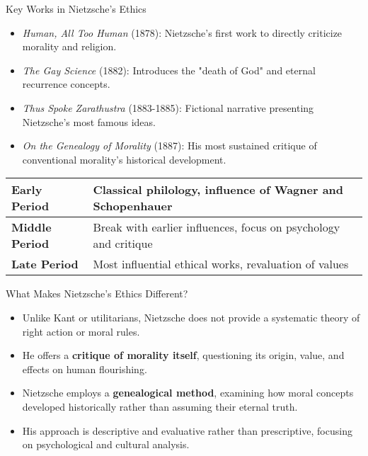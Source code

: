 \documentclass{beamer}
\begin{document}
    \begin{frame}{Key Works in Nietzsche's Ethics}
    \begin{itemize}
    \item \textit{Human, All Too Human} (1878): Nietzsche's first work to directly criticize morality and religion.
    \item \textit{The Gay Science} (1882): Introduces the "death of God" and eternal recurrence concepts.
    \item \textit{Thus Spoke Zarathustra} (1883-1885): Fictional narrative presenting Nietzsche's most famous ideas.
    \item \textit{On the Genealogy of Morality} (1887): His most sustained critique of conventional morality's historical development.
    \end{itemize}
    
    \begin{table}
        \scriptsize
    \begin{tabular}{ll}
    \toprule
    \textbf{Early Period} & Classical philology, influence of Wagner and Schopenhauer \\
    \midrule
    \textbf{Middle Period} & Break with earlier influences, focus on psychology and critique \\
    \midrule
    \textbf{Late Period} & Most influential ethical works, revaluation of values \\
    \bottomrule
    \end{tabular}
    \end{table}
    \end{frame}
    
    \begin{frame}{What Makes Nietzsche's Ethics Different?}
    \begin{itemize}
    \item Unlike Kant or utilitarians, Nietzsche does not provide a systematic theory of right action or moral rules.
    \item He offers a \textbf{critique of morality itself}, questioning its origin, value, and effects on human flourishing.
    \item Nietzsche employs a \textbf{genealogical method}, examining how moral concepts developed historically rather than assuming their eternal truth.
    \item His approach is descriptive and evaluative rather than prescriptive, focusing on psychological and cultural analysis.
    \end{itemize}
    
    \begin{center}
    \end{center}
    \end{frame}
    
\end{document}
